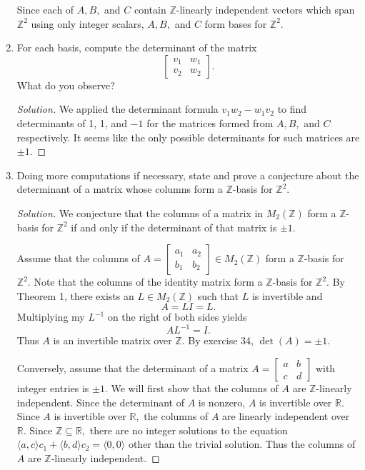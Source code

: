 \documentclass[12pt]{article}
\newcommand{\Z}{\mathbb{Z}}
\newcommand{\R}{\mathbb{R}}
\newenvironment{exercise}[2][Exercise]{\begin{trivlist}
        \item[\hskip \labelsep {\bfseries #1}\hskip \labelsep {\bfseries #2.}]}{\end{trivlist}}
\newenvironment{solution}
        {\begin{proof}[Solution]}
                    {\end{proof}}
\begin{document}
\begin{exercise}{38}
\begin{enumerate}[label=(\alph*)]
            Since each of \( A, B, \) and \( C \) contain \( \Z \)-linearly independent vectors which span \( \Z^{2} \) using only integer scalars, \( A,B, \) and \( C \) form bases for \( \Z^{2} . \)
        \item For each basis, compute the determinant of the matrix $$ \begin{bmatrix}
                v_{1} & w_{1}\\
                v_{2} & w_{2}
        \end{bmatrix} .$$ What do you observe?

        \begin{solution}
            We applied the determinant formula \( v_{1} w_{2} - w_{1} v_{2} \) to find determinants of 1, 1, and \( -1 \) for the matrices formed from \( A, B, \) and \( C \) respectively. It seems like the only possible determinants for such matrices are \( \pm 1. \)
        \end{solution}
    \item Doing more computations if necessary, state and prove a conjecture about the determinant of a matrix whose columns form a \( \Z \)-basis for \( \Z^{2} \).
        \begin{solution}
            We conjecture that the columns of a matrix in \( M_{2}(\Z) \) form a \( \Z \)-basis for \( \Z^{2} \) if and only if the determinant of that matrix is \( \pm 1. \)

            Assume that the columns of \( A = \begin{bmatrix}
                a_{1} & a_{2} \\
                b_{1} & b_{2}
            \end{bmatrix}\in M_{2}(\Z)  \) form a \( \Z \)-basis for \( \Z^{2} . \) Note that the columns of the identity matrix form a \( \Z \)-basis for \( \Z^{2} . \) By Theorem 1, there exists an \( L \in M_{2}(\Z) \) such that \( L \) is invertible and $$ A = L I = L. $$ Multiplying my \( L^{-1} \) on the right of both sides yields $$ A L^{-1} = I . $$ Thus \( A \) is an invertible matrix over \( \Z. \) By exercise 34, \( \det(A) = \pm 1. \)

            Conversely, assume that the determinant of a matrix \( A = \begin{bmatrix}
                a & b \\
                c & d
            \end{bmatrix} \) with integer entries is \( \pm 1. \) We will first show that the columns of \( A \) are \( \Z \)-linearly independent. Since the determinant of \( A \) is nonzero, \( A \) is invertible over \( \R. \) Since \( A \) is invertible over \( \R, \) the columns of \( A \) are linearly independent over \( \R. \) Since \( \Z \subseteq \R, \) there are no integer solutions to the equation \( \langle a,c \rangle c_{1} + \langle b,d \rangle c_{2} = \langle 0,0 \rangle \) other than the trivial solution. Thus the columns of \( A \) are \( \Z \)-linearly independent.


\end{solution}
\end{enumerate}
\end{exercise}
\end{document}
